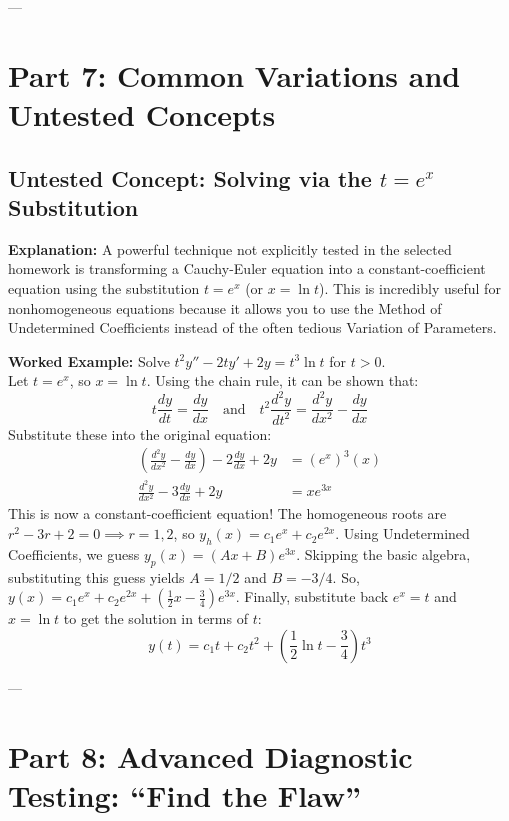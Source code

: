 \documentclass{article}
\begin{document}
---

\section{Part 7: Common Variations and Untested Concepts}

\subsection{Untested Concept: Solving via the $t = e^x$ Substitution}
\textbf{Explanation:} A powerful technique not explicitly tested in the selected homework is transforming a Cauchy-Euler equation into a constant-coefficient equation using the substitution $t = e^x$ (or $x = \ln t$). This is incredibly useful for nonhomogeneous equations because it allows you to use the Method of Undetermined Coefficients instead of the often tedious Variation of Parameters.

\textbf{Worked Example:} Solve $t^2 y'' - 2ty' + 2y = t^3 \ln t$ for $t > 0$. \\
Let $t = e^x$, so $x = \ln t$. Using the chain rule, it can be shown that:
\[ t \frac{dy}{dt} = \frac{dy}{dx} \quad \text{and} \quad t^2 \frac{d^2y}{dt^2} = \frac{d^2y}{dx^2} - \frac{dy}{dx} \]
Substitute these into the original equation:
\begin{align*}
\left( \frac{d^2y}{dx^2} - \frac{dy}{dx} \right) - 2 \frac{dy}{dx} + 2y &= (e^x)^3 (x) \\
\frac{d^2y}{dx^2} - 3 \frac{dy}{dx} + 2y &= x e^{3x}
\end{align*}
This is now a constant-coefficient equation! 
The homogeneous roots are $r^2 - 3r + 2 = 0 \implies r=1, 2$, so $y_h(x) = c_1 e^x + c_2 e^{2x}$.
Using Undetermined Coefficients, we guess $y_p(x) = (Ax + B)e^{3x}$. 
Skipping the basic algebra, substituting this guess yields $A = 1/2$ and $B = -3/4$.
So, $y(x) = c_1 e^x + c_2 e^{2x} + \left( \frac{1}{2}x - \frac{3}{4} \right) e^{3x}$.
Finally, substitute back $e^x = t$ and $x = \ln t$ to get the solution in terms of $t$:
\[ y(t) = c_1 t + c_2 t^2 + \left( \frac{1}{2} \ln t - \frac{3}{4} \right) t^3 \]

---

\section{Part 8: Advanced Diagnostic Testing: ``Find the Flaw''}
\end{document}
